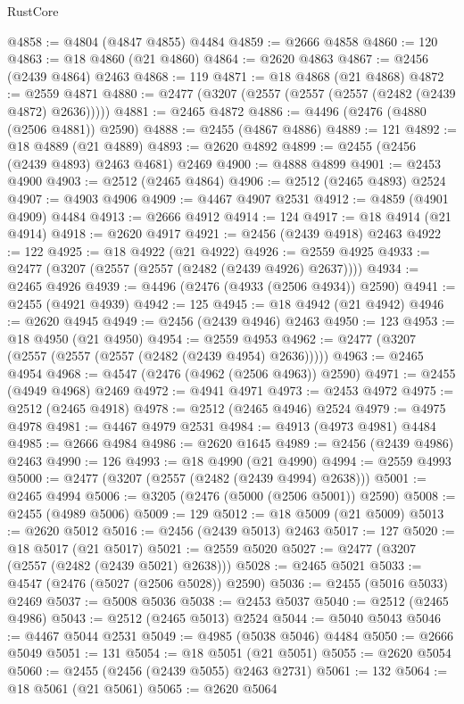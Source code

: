 \begin{lexlean}{RustCore}
\begin{coremodule}
@4858 := @4804 (@4847 @4855) @4484
@4859 := @2666 @4858
@4860 := 120
@4863 := @18 @4860 (@21 @4860)
@4864 := @2620 @4863
@4867 := @2456 (@2439 @4864) @2463
@4868 := 119
@4871 := @18 @4868 (@21 @4868)
@4872 := @2559 @4871
@4880 := @2477 (@3207 (@2557 (@2557 (@2557 (@2482 (@2439 @4872) @2636)))))
@4881 := @2465 @4872
@4886 := @4496 (@2476 (@4880 (@2506 @4881)) @2590)
@4888 := @2455 (@4867 @4886)
@4889 := 121
@4892 := @18 @4889 (@21 @4889)
@4893 := @2620 @4892
@4899 := @2455 (@2456 (@2439 @4893) @2463 @4681) @2469
@4900 := @4888 @4899
@4901 := @2453 @4900
@4903 := @2512 (@2465 @4864)
@4906 := @2512 (@2465 @4893) @2524
@4907 := @4903 @4906
@4909 := @4467 @4907 @2531
@4912 := @4859 (@4901 @4909) @4484
@4913 := @2666 @4912
@4914 := 124
@4917 := @18 @4914 (@21 @4914)
@4918 := @2620 @4917
@4921 := @2456 (@2439 @4918) @2463
@4922 := 122
@4925 := @18 @4922 (@21 @4922)
@4926 := @2559 @4925
@4933 := @2477 (@3207 (@2557 (@2557 (@2482 (@2439 @4926) @2637))))
@4934 := @2465 @4926
@4939 := @4496 (@2476 (@4933 (@2506 @4934)) @2590)
@4941 := @2455 (@4921 @4939)
@4942 := 125
@4945 := @18 @4942 (@21 @4942)
@4946 := @2620 @4945
@4949 := @2456 (@2439 @4946) @2463
@4950 := 123
@4953 := @18 @4950 (@21 @4950)
@4954 := @2559 @4953
@4962 := @2477 (@3207 (@2557 (@2557 (@2557 (@2482 (@2439 @4954) @2636)))))
@4963 := @2465 @4954
@4968 := @4547 (@2476 (@4962 (@2506 @4963)) @2590)
@4971 := @2455 (@4949 @4968) @2469
@4972 := @4941 @4971
@4973 := @2453 @4972
@4975 := @2512 (@2465 @4918)
@4978 := @2512 (@2465 @4946) @2524
@4979 := @4975 @4978
@4981 := @4467 @4979 @2531
@4984 := @4913 (@4973 @4981) @4484
@4985 := @2666 @4984
@4986 := @2620 @1645
@4989 := @2456 (@2439 @4986) @2463
@4990 := 126
@4993 := @18 @4990 (@21 @4990)
@4994 := @2559 @4993
@5000 := @2477 (@3207 (@2557 (@2482 (@2439 @4994) @2638)))
@5001 := @2465 @4994
@5006 := @3205 (@2476 (@5000 (@2506 @5001)) @2590)
@5008 := @2455 (@4989 @5006)
@5009 := 129
@5012 := @18 @5009 (@21 @5009)
@5013 := @2620 @5012
@5016 := @2456 (@2439 @5013) @2463
@5017 := 127
@5020 := @18 @5017 (@21 @5017)
@5021 := @2559 @5020
@5027 := @2477 (@3207 (@2557 (@2482 (@2439 @5021) @2638)))
@5028 := @2465 @5021
@5033 := @4547 (@2476 (@5027 (@2506 @5028)) @2590)
@5036 := @2455 (@5016 @5033) @2469
@5037 := @5008 @5036
@5038 := @2453 @5037
@5040 := @2512 (@2465 @4986)
@5043 := @2512 (@2465 @5013) @2524
@5044 := @5040 @5043
@5046 := @4467 @5044 @2531
@5049 := @4985 (@5038 @5046) @4484
@5050 := @2666 @5049
@5051 := 131
@5054 := @18 @5051 (@21 @5051)
@5055 := @2620 @5054
@5060 := @2455 (@2456 (@2439 @5055) @2463 @2731)
@5061 := 132
@5064 := @18 @5061 (@21 @5061)
@5065 := @2620 @5064

\end{coremodule}
\end{lexlean}
